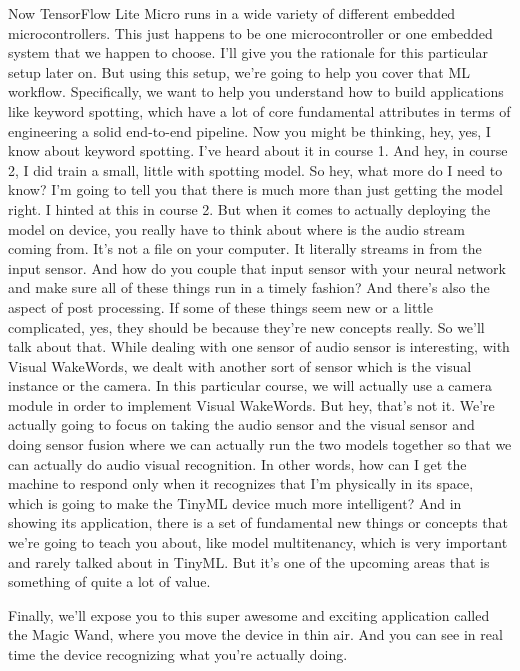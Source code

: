 Now TensorFlow Lite Micro runs in a wide variety of different embedded microcontrollers.
This just happens to be one microcontroller or one embedded system that we happen to choose.
I'll give you the rationale for this particular setup later on.
But using this setup, we're going to help you cover that ML workflow.
Specifically, we want to help you understand how to build applications like keyword spotting, which have a lot of core fundamental attributes in terms of engineering a solid end-to-end pipeline.
Now you might be thinking, hey, yes, I know about keyword spotting.
I've heard about it in course 1.
And hey, in course 2, I did train a small, little with spotting model.
So hey, what more do I need to know?
I'm going to tell you that there is much more than just getting the model right.
I hinted at this in course 2.
But when it comes to actually deploying the model on device, you really have to think about where is the audio stream coming from.
It's not a file on your computer.
It literally streams in from the input sensor.
And how do you couple that input sensor with your neural network and make sure all of these things run in a timely fashion?
And there's also the aspect of post processing.
If some of these things seem new or a little complicated, yes, they should be because they're new concepts really.
So we'll talk about that.
While dealing with one sensor of audio sensor is interesting, with Visual WakeWords, we dealt with another sort of sensor which is the visual instance or the camera.
In this particular course, we will actually use a camera module in order to implement Visual WakeWords.
But hey, that's not it.
We're actually going to focus on taking the audio sensor and the visual sensor and doing sensor fusion where we can actually run the two models together so that we can actually do audio visual recognition.
In other words, how can I get the machine to respond only when it recognizes that I'm physically in its space, which is going to make the TinyML device much more intelligent?
And in showing its application, there is a set of fundamental new things or concepts that we're going to teach you about, like model multitenancy, which is very important and rarely talked about in TinyML.
But it's one of the upcoming areas that is something of quite a lot of value.

Finally, we'll expose you to this super awesome and exciting application called the Magic Wand, where you move the device in thin air.
And you can see in real time the device recognizing what you're actually doing.

